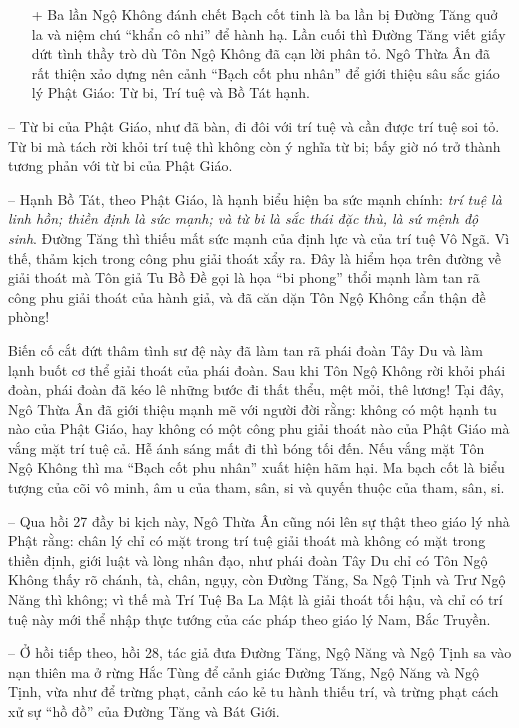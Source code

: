 \begin{enumerate}[label=\itshape\arabic*\upshape/]
   \item[+] Ba lần Ngộ Không đánh chết Bạch cốt tinh là ba lần bị Đường Tăng quở la và niệm chú ``khẩn cô nhi'' để hành hạ. Lần cuối thì Đường Tăng viết giấy dứt tình thầy trò dù Tôn Ngộ Không đã cạn lời phân tỏ. Ngô Thừa Ân đã rất thiện xảo dựng nên cảnh ``Bạch cốt phu nhân'' để giới thiệu sâu sắc giáo lý Phật Giáo: Từ bi, Trí tuệ và Bồ Tát hạnh.
\end{enumerate}

-- Từ bi của Phật Giáo, như đã bàn, đi đôi với trí tuệ và cần được trí tuệ soi tỏ. Từ bi mà tách rời khỏi trí tuệ thì không còn ý nghĩa từ bi; bấy giờ nó trở thành tương phản với từ bi của Phật Giáo.

-- Hạnh Bồ Tát, theo Phật Giáo, là hạnh biểu hiện ba sức mạnh chính: \emph{trí tuệ là linh hồn; thiền định là sức mạnh; và từ bi là sắc thái đặc thù, là sứ mệnh độ sinh}. Đường Tăng thì thiếu mất sức mạnh của định lực và của trí tuệ Vô Ngã. Vì thế, thảm kịch trong công phu giải thoát xẩy ra. Đây là hiểm họa trên đường về giải thoát mà Tôn giả Tu Bồ Đề gọi là họa ``bi phong'' thổi mạnh làm tan rã công phu giải thoát của hành giả, và đã căn dặn Tôn Ngộ Không cẩn thận đề phòng!

Biến cố cắt đứt thâm tình sư đệ này đã làm tan rã phái đoàn Tây Du và làm lạnh buốt cơ thể giải thoát của phái đoàn. Sau khi Tôn Ngộ Không rời khỏi phái đoàn, phái đoàn đã kéo lê những bước đi thất thểu, mệt mỏi, thê lương! Tại đây, Ngô Thừa Ân đã giới thiệu mạnh mẽ với người đời rằng: không có một hạnh tu nào của Phật Giáo, hay không có một công phu giải thoát nào của Phật Giáo mà vắng mặt trí tuệ cả. Hễ ánh sáng mất đi thì bóng tối đến. Nếu vắng mặt Tôn Ngộ Không thì ma ``Bạch cốt phu nhân'' xuất hiện hãm hại. Ma bạch cốt là biểu tượng của cõi vô minh, âm u của tham, sân, si và quyến thuộc của tham, sân, si.

-- Qua hồi 27 đầy bi kịch này, Ngô Thừa Ân cũng nói lên sự thật theo giáo lý nhà Phật rằng: chân lý chỉ có mặt trong trí tuệ giải thoát mà không có mặt trong thiền định, giới luật và lòng nhân đạo, như phái đoàn Tây Du chỉ có Tôn Ngộ Không thấy rõ chánh, tà, chân, ngụy, còn Đường Tăng, Sa Ngộ Tịnh và Trư Ngộ Năng thì không; vì thế mà Trí Tuệ Ba La Mật là giải thoát tối hậu, và chỉ có trí tuệ này mới thể nhập thực tướng của các pháp theo giáo lý Nam, Bắc Truyền.

-- Ở hồi tiếp theo, hồi 28, tác giả đưa Đường Tăng, Ngộ Năng và Ngộ Tịnh sa vào nạn thiên ma ở rừng Hắc Tùng để cảnh giác Đường Tăng, Ngộ Năng và Ngộ Tịnh, vừa như để trừng phạt, cảnh cáo kẻ tu hành thiếu trí, và trừng phạt cách xử sự ``hồ đồ'' của Đường Tăng và Bát Giới.


